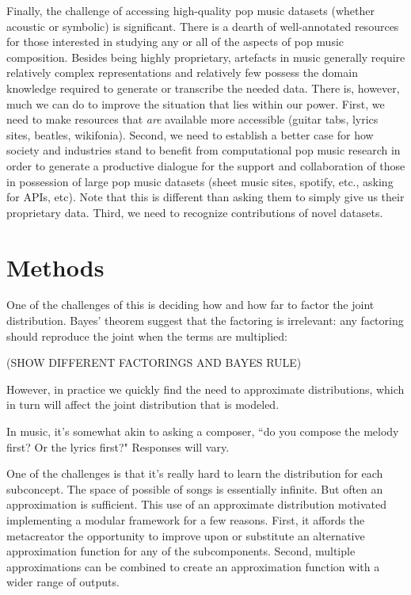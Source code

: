 \documentclass[letterpaper]{article}
\begin{document}
Finally, the challenge of accessing high-quality pop music datasets (whether acoustic or symbolic) is significant. There is a dearth of well-annotated resources for those interested in studying any or all of the aspects of pop music composition. Besides being highly proprietary, artefacts in music generally require relatively complex representations and relatively few possess the domain knowledge required to generate or transcribe the needed data. There is, however, much we can do to improve the situation that lies within our power. First, we need to make resources that \textit{are} available more accessible (guitar tabs, lyrics sites, beatles, wikifonia). Second, we need to establish a better case for how society and industries stand to benefit from computational pop music research in order to generate a productive dialogue for the support and collaboration of those in possession of large pop music datasets (sheet music sites, spotify, etc., asking for APIs, etc). Note that this is different than asking them to simply give us their proprietary data. Third, we need to recognize contributions of novel datasets. 

\section{Methods}

One of the challenges of this is deciding how and how far to factor the joint distribution. Bayes' theorem suggest that the factoring is irrelevant: any factoring should reproduce the joint when the terms are multiplied:

(SHOW DIFFERENT FACTORINGS AND BAYES RULE)

However, in practice we quickly find the need to approximate distributions, which in turn will affect the joint distribution that is modeled.

 In music, it's somewhat akin to asking a composer, ``do you compose the melody first? Or the lyrics first?" Responses will vary. 

One of the challenges is that it's really hard to learn the distribution for each subconcept. The space of possible of songs is essentially infinite. But often an approximation is sufficient. This use of an approximate distribution motivated implementing a modular framework for a few reasons. First, it affords the metacreator the opportunity to improve upon or substitute an alternative approximation function for any of the subcomponents. Second, multiple approximations can be combined to create an approximation function with a wider range of outputs.
\end{document}
